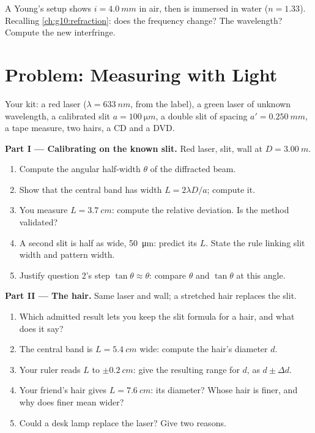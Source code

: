 \begin{exercise}[$\star\star\star$]\label{exo:g12:light-as-wave:15}
A Young's setup shows $i = \qty{4.0}{mm}$ in air, then is immersed in
water ($n = 1.33$). Recalling \cref{ch:g10:refraction}: does the
frequency change? The wavelength? Compute the new interfringe.
\end{exercise}

\section{Problem: Measuring with Light}

\begin{problem}
\label{pb:g12:light-as-wave:1}
Your kit: a red laser ($\lambda = \qty{633}{nm}$, from the label), a
green laser of unknown wavelength, a calibrated slit
$a = \qty{100}{\micro m}$, a double slit of spacing $a' =
\qty{0.250}{mm}$, a tape measure, two hairs, a CD and a DVD.

\medskip
\noindent\textbf{Part I --- Calibrating on the known slit.}
Red laser, slit, wall at $D = \qty{3.00}{m}$.
\begin{enumerate}
  \item Compute the angular half-width $\theta$ of the diffracted beam.
  \item Show that the central band has width $L = 2\lambda D/a$;
        compute it.
  \item You measure $L = \qty{3.7}{cm}$: compute the relative
        deviation. Is the method validated?
  \item A second slit is half as wide, \qty{50}{\micro m}: predict its
        $L$. State the rule linking slit width and pattern width.
  \item Justify question 2's step $\tan\theta \approx \theta$: compare
        $\theta$ and $\tan\theta$ at this angle.
\end{enumerate}

\medskip
\noindent\textbf{Part II --- The hair.} Same laser and wall; a
stretched hair replaces the slit.
\begin{enumerate}[resume]
  \item Which admitted result lets you keep the slit formula for a
        hair, and what does it say?
  \item The central band is $L = \qty{5.4}{cm}$ wide: compute the
        hair's diameter $d$.
  \item Your ruler reads $L$ to $\pm\qty{0.2}{cm}$: give the resulting
        range for $d$, as $d \pm \Delta d$.
  \item Your friend's hair gives $L = \qty{7.6}{cm}$: its diameter?
        Whose hair is finer, and why does finer mean wider?
  \item Could a desk lamp replace the laser? Give two reasons.
\end{enumerate}


\end{problem}
